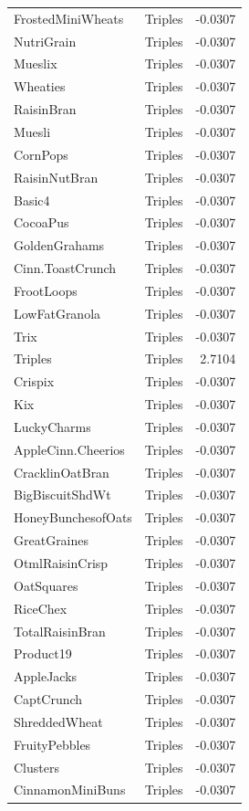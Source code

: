 \begin{longtable}{llr}
FrostedMiniWheats & Triples & -0.0307 \\
NutriGrain & Triples & -0.0307 \\
Mueslix & Triples & -0.0307 \\
Wheaties & Triples & -0.0307 \\
RaisinBran & Triples & -0.0307 \\
Muesli & Triples & -0.0307 \\
CornPops & Triples & -0.0307 \\
RaisinNutBran & Triples & -0.0307 \\
Basic4 & Triples & -0.0307 \\
CocoaPus & Triples & -0.0307 \\
GoldenGrahams & Triples & -0.0307 \\
Cinn.ToastCrunch & Triples & -0.0307 \\
FrootLoops & Triples & -0.0307 \\
LowFatGranola & Triples & -0.0307 \\
Trix & Triples & -0.0307 \\
Triples & Triples & 2.7104 \\
Crispix & Triples & -0.0307 \\
Kix & Triples & -0.0307 \\
LuckyCharms & Triples & -0.0307 \\
AppleCinn.Cheerios & Triples & -0.0307 \\
CracklinOatBran & Triples & -0.0307 \\
BigBiscuitShdWt & Triples & -0.0307 \\
HoneyBunchesofOats & Triples & -0.0307 \\
GreatGraines & Triples & -0.0307 \\
OtmlRaisinCrisp & Triples & -0.0307 \\
OatSquares & Triples & -0.0307 \\
RiceChex & Triples & -0.0307 \\
TotalRaisinBran & Triples & -0.0307 \\
Product19 & Triples & -0.0307 \\
AppleJacks & Triples & -0.0307 \\
CaptCrunch & Triples & -0.0307 \\
ShreddedWheat & Triples & -0.0307 \\
FruityPebbles & Triples & -0.0307 \\
Clusters & Triples & -0.0307 \\
CinnamonMiniBuns & Triples & -0.0307 \\

\end{longtable}
